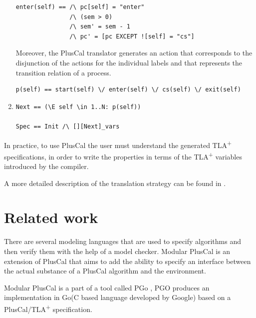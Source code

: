 \documentclass{thesul}
\newcommand{\tlaplus}{TLA\textsuperscript{+}\xspace}
\begin{document}
\begin{enumerate}
\begin{lstlisting}[frame = tlrb, firstnumber = 1, xleftmargin=.2\textwidth, xrightmargin=.2\textwidth]
enter(self) == /\ pc[self] = "enter"
               /\ (sem > 0)
               /\ sem' = sem - 1
               /\ pc' = [pc EXCEPT ![self] = "cs"]
\end{lstlisting}

Moreover, the PlusCal translator generates an action that corresponds to the disjunction of the actions for the individual labels and that represents the transition relation of a process.

\begin{lstlisting}[frame = tlrb, firstnumber = 1, xleftmargin=.05\textwidth, xrightmargin=.05\textwidth]
p(self) == start(self) \/ enter(self) \/ cs(self) \/ exit(self)
\end{lstlisting}

\item


\begin{lstlisting}[frame = tlrb, firstnumber = 1, xleftmargin=.2\textwidth, xrightmargin=.2\textwidth]
Next == (\E self \in 1..N: p(self))

Spec == Init /\ [][Next]_vars

\end{lstlisting}

\end{enumerate}


In practice, to use PlusCal the user must understand the generated \tlaplus specifications, in order to write the properties in terms of the \tlaplus variables introduced by the compiler.

A more detailed description of the translation strategy can be found in \cite{pcalAlgo}.

\chapter{Related work}

There are several modeling languages that are used to specify algorithms and then verify them with the help of a model checker. Modular PlusCal \cite{ModularPlusCal} is an extension of PlusCal that aims to add the ability to specify an interface between the actual substance of a PlusCal algorithm and the environment.

Modular PlusCal is a part of a tool called PGo \cite{PGO}, PGO produces an implementation in Go(C based language developed by Google) based on a PlusCal/\tlaplus specification.
\end{document}
